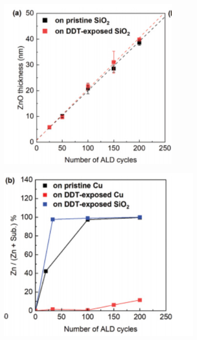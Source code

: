 \documentclass[UTF8,a4paper,12pt]{ctexart}%
\begin{document}
\begin{figure}[htb]
	\centering
	\begin{minipage}[t]{0.3\textwidth}
	\centering
	\includegraphics[width=0.8\textwidth]{10.jpg}
	\label{Fig:10}
	\end{minipage}
	\begin{minipage}[t]{0.3\textwidth}
	\centering
	\includegraphics[width=0.9\textwidth]{11.jpg}
	\label{Fig:11}
	\end{minipage}
	\begin{minipage}[t]{0.3\textwidth}
	\centering

\end{minipage}
\end{figure}
\end{document}
